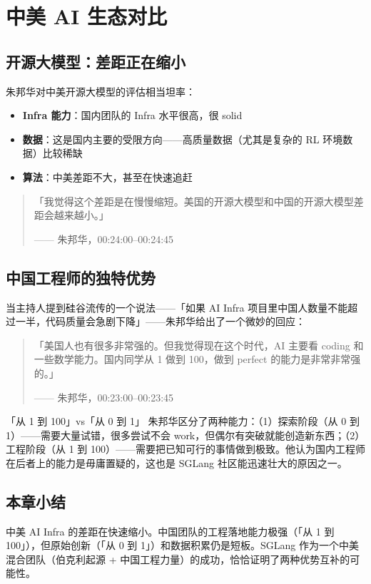 \documentclass[a4paper]{article}
\begin{document}
\section{中美 AI 生态对比}

\subsection{开源大模型：差距正在缩小}

朱邦华对中美开源大模型的评估相当坦率：

\begin{itemize}
\item \textbf{Infra 能力}：国内团队的 Infra 水平很高，很 solid
\item \textbf{数据}：这是国内主要的受限方向——高质量数据（尤其是复杂的 RL 环境数据）比较稀缺
\item \textbf{算法}：中美差距不大，甚至在快速追赶
\end{itemize}

\begin{quote}
「我觉得这个差距是在慢慢缩短。美国的开源大模型和中国的开源大模型差距会越来越小。」\par
\hfill —— 朱邦华，00:24:00--00:24:45
\end{quote}

\subsection{中国工程师的独特优势}

当主持人提到硅谷流传的一个说法——「如果 AI Infra 项目里中国人数量不能超过一半，代码质量会急剧下降」——朱邦华给出了一个微妙的回应：

\begin{quote}
「美国人也有很多非常强的。但我觉得现在这个时代，AI 主要看 coding 和一些数学能力。国内同学从 1 做到 100，做到 perfect 的能力是非常非常强的。」\par
\hfill —— 朱邦华，00:23:00--00:23:45
\end{quote}

\begin{knowledgebox}{「从 1 到 100」vs「从 0 到 1」}
朱邦华区分了两种能力：（1）探索阶段（从 0 到 1）——需要大量试错，很多尝试不会 work，但偶尔有突破就能创造新东西；（2）工程阶段（从 1 到 100）——需要把已知可行的事情做到极致。他认为国内工程师在后者上的能力是毋庸置疑的，这也是 SGLang 社区能迅速壮大的原因之一。
\end{knowledgebox}

\subsection{本章小结}
中美 AI Infra 的差距在快速缩小。中国团队的工程落地能力极强（「从 1 到 100」），但原始创新（「从 0 到 1」）和数据积累仍是短板。SGLang 作为一个中美混合团队（伯克利起源 + 中国工程力量）的成功，恰恰证明了两种优势互补的可能性。
\end{document}
